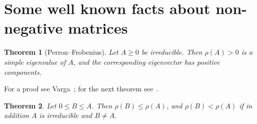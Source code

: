 \documentclass[11pt]{article}
\theoremstyle{plain}
\newtheorem{theorem}{Theorem}[section]
\theoremstyle{definition}
\theoremstyle{remark}
\numberwithin{equation}{section}
\numberwithin{figure}{section}
\numberwithin{table}{section}
\begin{document}
\section{Some well known facts about non-negative matrices}\label{sec-facts}

\begin{theorem}[Perron--Frobenius]\label{pf}
Let $A\ge 0$ be irreducible. Then $\rho(A)>0$ is a simple eigenvalue of $A$,
and the corresponding eigenvector has positive components.
\end{theorem}

For a proof see Varga~\cite[Theorem 2.7]{2000Varga-aa}; for the next
theorem see~\cite[Section 8.1]{1985Horn_Johnson}.

\begin{theorem}\label{mono}
Let $0\le B\le A$. Then $\rho(B)\le\rho(A)$, and $\rho(B)<\rho(A)$ if in
addition $A$ is irreducible and $B\neq A$.
\end{theorem}
\end{document}
